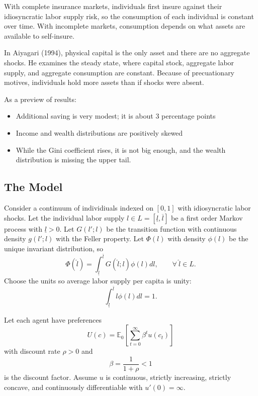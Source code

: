 \documentclass{tufte-handout}
\newcommand*\E{\mathbb{E}}
\theoremstyle{definition}
\begin{document}
With complete insurance markets, individuals first insure against their idiosyncratic labor supply risk, so the consumption of each individual is constant over time. With incomplete markets, consumption depends on what assets are available to self-insure.

In Aiyagari (1994), physical capital is the only asset and there are no aggregate shocks. He examines the steady state, where capital stock, aggregate labor supply, and aggregate consumption are constant. Because of precuationary motives, individuals hold more assets than if shocks were absent.

As a preview of results:
\begin{itemize}
	\item Additional saving is very modest; it is about 3 percentage points
	\item Income and wealth distributions are positively skewed
	\item While the Gini coefficient rises, it is not big enough, and the wealth distribution is missing the upper tail.
\end{itemize}

\subsection{The Model}
Consider a continuum of individiuals indexed on $[0,1]$ with idiosyncratic labor shocks. Let the individual labor supply $l \in L = \left[ \underline{l}, \overline{l} \right]$ be a first order Markov process with $\underline{l} > 0$. Let $G(l';l)$ be the transition function with continuous density $g(l';l)$ with the Feller property. Let $\Phi(l)$ with density $\phi(l)$ be the unique invariant distribution, so \[
	\Phi(\hat{l}) = \int_{\underline{l}}^{\overline{l}}  G(\hat{l};l)\phi(l)dl, \qquad \forall\ \hat{l} \in L 
.\] Choose the units so average labor supply per capita is unity: \[
	\int_{\underline{l}}^{\overline{l}}  l \phi(l)dl = 1 
.\]

 Let each agent have preferences \[
	U\left( c \right) = \E_0\left[\sum\limits_{t=0}^{\infty} \beta^{t} u(c_t)\right] 
\] with discount rate $\rho > 0 $ and \[
	\beta = \frac{1}{1+\rho} <1
\] is the discount factor. Assume $u$ is continuous, strictly increasing, strictly concave, and continuously differentiable with $u'(0) = \infty$.
\end{document}
